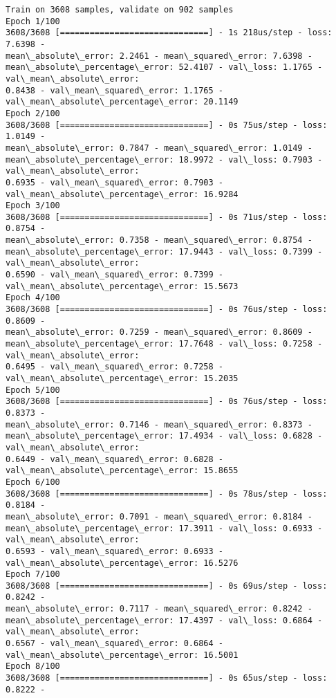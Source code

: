 \documentclass[11pt]{article}
\begin{document}
    \begin{Verbatim}[commandchars=\\\{\},fontsize=\footnotesize]
Train on 3608 samples, validate on 902 samples
Epoch 1/100
3608/3608 [==============================] - 1s 218us/step - loss: 7.6398 -
mean\_absolute\_error: 2.2461 - mean\_squared\_error: 7.6398 -
mean\_absolute\_percentage\_error: 52.4107 - val\_loss: 1.1765 - val\_mean\_absolute\_error:
0.8438 - val\_mean\_squared\_error: 1.1765 - val\_mean\_absolute\_percentage\_error: 20.1149
Epoch 2/100
3608/3608 [==============================] - 0s 75us/step - loss: 1.0149 -
mean\_absolute\_error: 0.7847 - mean\_squared\_error: 1.0149 -
mean\_absolute\_percentage\_error: 18.9972 - val\_loss: 0.7903 - val\_mean\_absolute\_error:
0.6935 - val\_mean\_squared\_error: 0.7903 - val\_mean\_absolute\_percentage\_error: 16.9284
Epoch 3/100
3608/3608 [==============================] - 0s 71us/step - loss: 0.8754 -
mean\_absolute\_error: 0.7358 - mean\_squared\_error: 0.8754 -
mean\_absolute\_percentage\_error: 17.9443 - val\_loss: 0.7399 - val\_mean\_absolute\_error:
0.6590 - val\_mean\_squared\_error: 0.7399 - val\_mean\_absolute\_percentage\_error: 15.5673
Epoch 4/100
3608/3608 [==============================] - 0s 76us/step - loss: 0.8609 -
mean\_absolute\_error: 0.7259 - mean\_squared\_error: 0.8609 -
mean\_absolute\_percentage\_error: 17.7648 - val\_loss: 0.7258 - val\_mean\_absolute\_error:
0.6495 - val\_mean\_squared\_error: 0.7258 - val\_mean\_absolute\_percentage\_error: 15.2035
Epoch 5/100
3608/3608 [==============================] - 0s 76us/step - loss: 0.8373 -
mean\_absolute\_error: 0.7146 - mean\_squared\_error: 0.8373 -
mean\_absolute\_percentage\_error: 17.4934 - val\_loss: 0.6828 - val\_mean\_absolute\_error:
0.6449 - val\_mean\_squared\_error: 0.6828 - val\_mean\_absolute\_percentage\_error: 15.8655
Epoch 6/100
3608/3608 [==============================] - 0s 78us/step - loss: 0.8184 -
mean\_absolute\_error: 0.7091 - mean\_squared\_error: 0.8184 -
mean\_absolute\_percentage\_error: 17.3911 - val\_loss: 0.6933 - val\_mean\_absolute\_error:
0.6593 - val\_mean\_squared\_error: 0.6933 - val\_mean\_absolute\_percentage\_error: 16.5276
Epoch 7/100
3608/3608 [==============================] - 0s 69us/step - loss: 0.8242 -
mean\_absolute\_error: 0.7117 - mean\_squared\_error: 0.8242 -
mean\_absolute\_percentage\_error: 17.4397 - val\_loss: 0.6864 - val\_mean\_absolute\_error:
0.6567 - val\_mean\_squared\_error: 0.6864 - val\_mean\_absolute\_percentage\_error: 16.5001
Epoch 8/100
3608/3608 [==============================] - 0s 65us/step - loss: 0.8222 -

\end{Verbatim}
\end{document}
